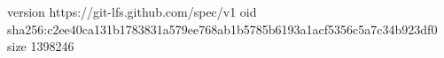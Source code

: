 version https://git-lfs.github.com/spec/v1
oid sha256:c2ee40ca131b1783831a579ee768ab1b5785b6193a1acf5356c5a7c34b923df0
size 1398246
